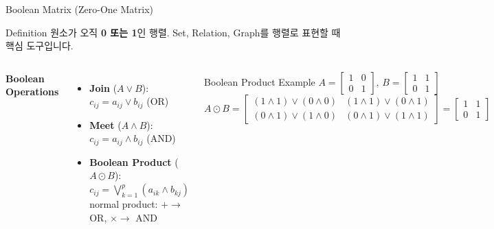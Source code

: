 \documentclass{beamer}
\begin{document}
\begin{frame}[t,shrink=6]{Boolean Matrix (Zero-One Matrix)}
    \small
    \vspace{0.05cm}
    \begin{block}{Definition}
        \footnotesize 원소가 오직 \textbf{0 또는 1}인 행렬. Set, Relation, Graph를 행렬로 표현할 때 핵심 도구입니다.
    \end{block}

    \vspace{0.08cm}
    \begin{columns}[T]
        \textbf{Boolean Operations}
        \vspace{0.05cm}

        \footnotesize
        \begin{itemize}\setlength\itemsep{0.15em}
            \item \textbf{Join} ($A \lor B$): $c_{ij} = a_{ij} \lor b_{ij}$ \; (OR)
            \item \textbf{Meet} ($A \land B$): $c_{ij} = a_{ij} \land b_{ij}$ \; (AND)
            \item \textbf{Boolean Product} ($A \odot B$):\\[2pt]
                  $c_{ij} = \displaystyle\bigvee_{k=1}^{p}(a_{ik} \land b_{kj})$\\[4pt]
                  normal product: $+ \to$ OR, $\times \to$ AND
        \end{itemize}

        \vspace{0.08cm}
        \begin{exampleblock}{\scriptsize Boolean Product Example}
            \scriptsize
            $A = \begin{bmatrix}1&0\\0&1\end{bmatrix}$,\;
            $B = \begin{bmatrix}1&1\\0&1\end{bmatrix}$\\[3pt]
            $A \odot B = \begin{bmatrix}(1{\land}1){\lor}(0{\land}0) & (1{\land}1){\lor}(0{\land}1)\\(0{\land}1){\lor}(1{\land}0) & (0{\land}1){\lor}(1{\land}1)\end{bmatrix} = \begin{bmatrix}1&1\\0&1\end{bmatrix}$
        \end{exampleblock}


\end{columns}
\end{frame}
\end{document}
